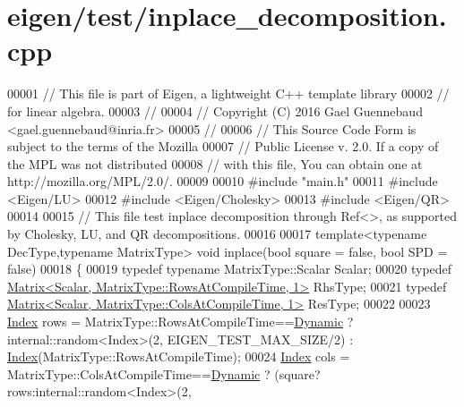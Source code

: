 \hypertarget{eigen_2test_2inplace__decomposition_8cpp_source}{}\section{eigen/test/inplace\+\_\+decomposition.cpp}
\label{eigen_2test_2inplace__decomposition_8cpp_source}

\begin{DoxyCode}
00001 \textcolor{comment}{// This file is part of Eigen, a lightweight C++ template library}
00002 \textcolor{comment}{// for linear algebra.}
00003 \textcolor{comment}{//}
00004 \textcolor{comment}{// Copyright (C) 2016 Gael Guennebaud <gael.guennebaud@inria.fr>}
00005 \textcolor{comment}{//}
00006 \textcolor{comment}{// This Source Code Form is subject to the terms of the Mozilla}
00007 \textcolor{comment}{// Public License v. 2.0. If a copy of the MPL was not distributed}
00008 \textcolor{comment}{// with this file, You can obtain one at http://mozilla.org/MPL/2.0/.}
00009 
00010 \textcolor{preprocessor}{#include "main.h"}
00011 \textcolor{preprocessor}{#include <Eigen/LU>}
00012 \textcolor{preprocessor}{#include <Eigen/Cholesky>}
00013 \textcolor{preprocessor}{#include <Eigen/QR>}
00014 
00015 \textcolor{comment}{// This file test inplace decomposition through Ref<>, as supported by Cholesky, LU, and QR decompositions.}
00016 
00017 \textcolor{keyword}{template}<\textcolor{keyword}{typename} DecType,\textcolor{keyword}{typename} MatrixType> \textcolor{keywordtype}{void} inplace(\textcolor{keywordtype}{bool} square = \textcolor{keyword}{false}, \textcolor{keywordtype}{bool} SPD = \textcolor{keyword}{false})
00018 \{
00019   \textcolor{keyword}{typedef} \textcolor{keyword}{typename} MatrixType::Scalar Scalar;
00020   \textcolor{keyword}{typedef} \hyperlink{group___core___module_class_eigen_1_1_matrix}{Matrix<Scalar, MatrixType::RowsAtCompileTime, 1>} 
      RhsType;
00021   \textcolor{keyword}{typedef} \hyperlink{group___core___module_class_eigen_1_1_matrix}{Matrix<Scalar, MatrixType::ColsAtCompileTime, 1>} 
      ResType;
00022 
00023   \hyperlink{namespace_eigen_a62e77e0933482dafde8fe197d9a2cfde}{Index} rows = MatrixType::RowsAtCompileTime==\hyperlink{namespace_eigen_ad81fa7195215a0ce30017dfac309f0b2}{Dynamic} ? internal::random<Index>(2,
      EIGEN\_TEST\_MAX\_SIZE/2) : \hyperlink{namespace_eigen_a62e77e0933482dafde8fe197d9a2cfde}{Index}(MatrixType::RowsAtCompileTime);
00024   \hyperlink{namespace_eigen_a62e77e0933482dafde8fe197d9a2cfde}{Index} cols = MatrixType::ColsAtCompileTime==\hyperlink{namespace_eigen_ad81fa7195215a0ce30017dfac309f0b2}{Dynamic} ? (square?rows:internal::random<Index>(2,

\end{DoxyCode}
